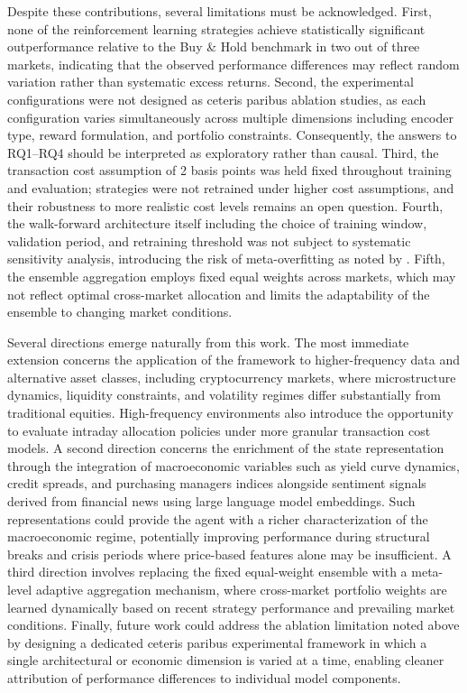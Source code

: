 \documentclass[]{elsarticle}
\begin{document}
Despite these contributions, several limitations must be acknowledged. First, none of the reinforcement learning strategies achieve statistically significant outperformance relative to the Buy \& Hold benchmark in two out of three markets, indicating that the observed performance differences may reflect random variation rather than systematic excess returns. Second, the experimental configurations were not designed as ceteris paribus ablation studies, as each configuration varies simultaneously across multiple dimensions including encoder type, reward formulation, and portfolio constraints. Consequently, the answers to RQ1--RQ4 should be interpreted as exploratory rather than causal. Third, the transaction cost assumption of 2 basis points was held fixed throughout training and evaluation; strategies were not retrained under higher cost assumptions, and their robustness to more realistic cost levels remains an open question. Fourth, the walk-forward architecture itself including the choice of training window, validation period, and retraining threshold was not subject to systematic sensitivity analysis, introducing the risk of meta-overfitting as noted by \citet{Bailey2014}. Fifth, the ensemble aggregation employs fixed equal weights across markets, which may not reflect optimal cross-market allocation and limits the adaptability of the ensemble to changing market conditions.

Several directions emerge naturally from this work. The most immediate extension concerns the application of the framework to higher-frequency data and alternative asset classes, including cryptocurrency markets, where microstructure dynamics, liquidity constraints, and volatility regimes differ substantially from traditional equities. High-frequency environments also introduce the opportunity to evaluate intraday allocation policies under more granular transaction cost models. A second direction concerns the enrichment of the state representation through the integration of macroeconomic variables such as yield curve dynamics, credit spreads, and purchasing managers indices alongside sentiment signals derived from financial news using large language model embeddings. Such representations could provide the agent with a richer characterization of the macroeconomic regime, potentially improving performance during structural breaks and crisis periods where price-based features alone may be insufficient. A third direction involves replacing the fixed equal-weight ensemble with a meta-level adaptive aggregation mechanism, where cross-market portfolio weights are learned dynamically based on recent strategy performance and prevailing market conditions. Finally, future work could address the ablation limitation noted above by designing a dedicated ceteris paribus experimental framework in which a single architectural or economic dimension is varied at a time, enabling cleaner attribution of performance differences to individual model components.

\setlength{\bibsep}{2pt}

 
\end{document}
